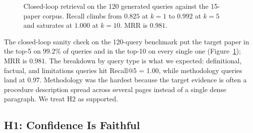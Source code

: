 \documentclass[10pt]{article}
\begin{document}
\begin{figure}[t]
\centering
{}
\caption{Closed-loop retrieval on the 120 generated queries against
the 15-paper corpus. Recall climbs from $0.825$ at $k=1$ to $0.992$
at $k=5$ and saturates at $1.000$ at $k=10$. MRR is $0.981$.}
\label{fig:recall}
\end{figure}

The closed-loop sanity check on the 120-query benchmark put the
target paper in the top-5 on $99.2\%$ of queries and in the top-10
on every single one (Figure~\ref{fig:recall}); MRR is $0.981$. The
breakdown by query type is what we expected: definitional, factual,
and limitations queries hit Recall@5 = 1.00, while methodology
queries land at $0.97$. Methodology was the hardest because the
target evidence is often a procedure description spread across
several pages instead of a single dense paragraph. We treat H2 as
supported.

\subsection{H1: Confidence Is Faithful}
\end{document}
